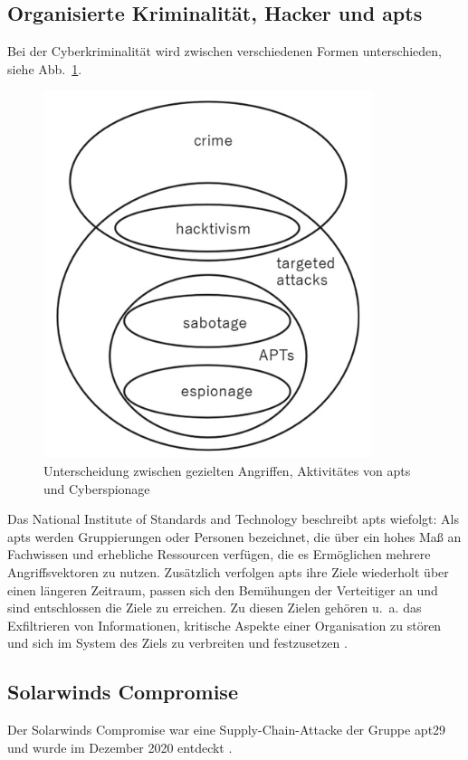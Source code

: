 \documentclass[conference]{IEEEtran}
\begin{document}
\subsection{Organisierte Kriminalität, Hacker und \aclp*{apt}}
\label{sec:introduction:apt}

Bei der Cyberkriminalität wird zwischen verschiedenen Formen unterschieden, siehe Abb.~\ref{fig.destinction}.
\begin{figure}[htbp]
    \centerline{\includegraphics[scale=0.8]{figures/Destinction between targeted attacks, activity by APTs, and cyber-espionage.png}}
    \caption{Unterscheidung zwischen gezielten Angriffen, Aktivitätes von \acp{apt} und Cyberspionage \protect\cite[S.~6]{Steffens2020}}
    \label{fig.destinction}
\end{figure}
Das National Institute of Standards and Technology beschreibt \acp{apt} wiefolgt:
Als \acp{apt} werden Gruppierungen oder Personen bezeichnet, die über ein hohes Maß an Fachwissen und erhebliche Ressourcen verfügen, die es Ermöglichen mehrere Angriffsvektoren zu nutzen.
Zusätzlich verfolgen \acp{apt} ihre Ziele wiederholt über einen längeren Zeitraum, passen sich den Bemühungen der Verteitiger an und sind entschlossen die Ziele zu erreichen.
Zu diesen Zielen gehören u.~a. das Exfiltrieren von Informationen, kritische Aspekte einer Organisation zu stören und sich im System des Ziels zu verbreiten und festzusetzen \cite[S.~B-1]{NIST2011}.

\subsection{Solarwinds Compromise}
\label{sec:introduction:solarwinds}
Der Solarwinds Compromise war eine Supply-Chain-Attacke der Gruppe \ac{apt}29 und wurde im Dezember 2020 entdeckt \cite{MITRESolarwindsCompromise}.
\end{document}
